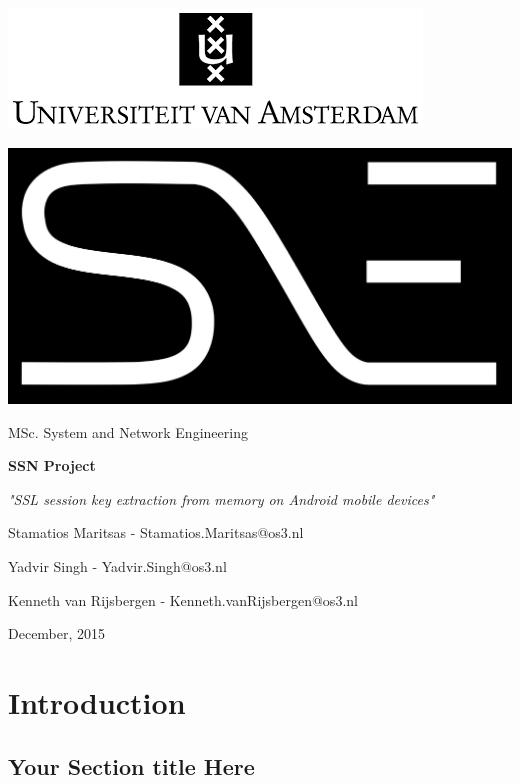 \documentclass[12pt, a4paper]{report}
\begin{document}
\begin{center}
\includegraphics[scale=0.6]{images/logo-uva.png}
\vspace{30pt}

\includegraphics[scale=0.2]{images/logo-sne_black-inv-flat}
\vspace{10pt}

\Large MSc. System and Network Engineering
\vspace{100pt}

\textbf{\huge SSN Project}
\vspace{10pt}

\textit{\Large "SSL session key extraction from memory on Android mobile devices"}
\vspace{80pt}

\large Stamatios Maritsas - Stamatios.Maritsas@os3.nl

\large Yadvir Singh - Yadvir.Singh@os3.nl

\large Kenneth van Rijsbergen - Kenneth.vanRijsbergen@os3.nl
\vspace{80pt}

\normalsize December, 2015
\end{center}

\tableofcontents

\chapter{Introduction}
\section{Your Section title Here}
\end{document}
